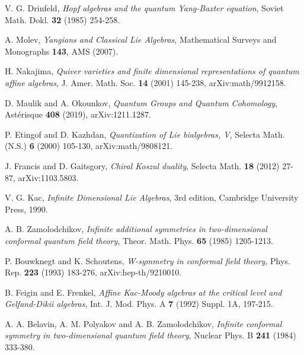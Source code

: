 \begin{thebibliography}{99}

V. G. Drinfeld, \emph{Hopf algebras and the quantum Yang-Baxter equation}, 
Soviet Math. Dokl. \textbf{32} (1985) 254-258.

A. Molev, \emph{Yangians and Classical Lie Algebras}, 
Mathematical Surveys and Monographs \textbf{143}, AMS (2007).

H. Nakajima, \emph{Quiver varieties and finite dimensional representations of 
quantum affine algebras}, 
J. Amer. Math. Soc. \textbf{14} (2001) 145-238, arXiv:math/9912158.

D. Maulik and A. Okounkov, \emph{Quantum Groups and Quantum Cohomology}, 
Astérisque \textbf{408} (2019), arXiv:1211.1287.


P. Etingof and D. Kazhdan, \emph{Quantization of Lie bialgebras, V}, 
Selecta Math. (N.S.) \textbf{6} (2000) 105-130, arXiv:math/9808121.

J. Francis and D. Gaitsgory, \emph{Chiral Koszul duality}, 
Selecta Math. \textbf{18} (2012) 27-87, arXiv:1103.5803.


V. G. Kac, \emph{Infinite Dimensional Lie Algebras}, 
3rd edition, Cambridge University Press, 1990.

A. B. Zamolodchikov, \emph{Infinite additional symmetries in two-dimensional conformal quantum field theory},
Theor. Math. Phys. \textbf{65} (1985) 1205-1213.

P. Bouwknegt and K. Schoutens, \emph{W-symmetry in conformal field theory},
Phys. Rep. \textbf{223} (1993) 183-276, arXiv:hep-th/9210010.

B. Feigin and E. Frenkel, \emph{Affine Kac-Moody algebras at the critical level and Gelfand-Dikii algebras},
Int. J. Mod. Phys. A \textbf{7} (1992) Suppl. 1A, 197-215.

A. A. Belavin, A. M. Polyakov and A. B. Zamolodchikov, 
\emph{Infinite conformal symmetry in two-dimensional quantum field theory}, 
Nuclear Phys. B \textbf{241} (1984) 333-380.
 
\end{thebibliography}
